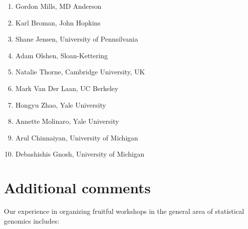 \documentclass[12pt]{amsart}
\begin{document}
\begin{enumerate}
\item Gordon Mills, MD Anderson

\item Karl Broman, John Hopkins

\item Shane Jensen, University of Pennsilvania

\item Adam Olshen, Sloan-Kettering

\item Natalie Thorne, Cambridge University, UK

\item Mark Van Der Laan, UC Berkeley

\item Hongyu Zhao, Yale University

\item Annette Molinaro, Yale University

\item Arul Chinnaiyan{\mathbf{*}}, University of Michigan

\item Debashishis Gnosh, University of Michigan


\end{enumerate}


\section*{Additional comments}

Our experience in organizing fruitful workshops in the 
general area of statistical genomics includes:
\end{document}
